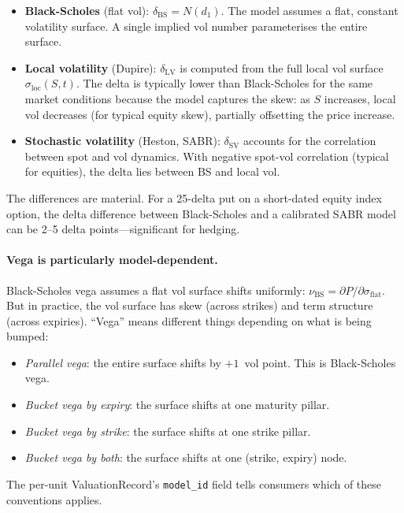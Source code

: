 \documentclass[11pt,a4paper]{article}
\begin{document}
\begin{itemize}[nosep]
\item \textbf{Black-Scholes} (flat vol): $\delta_{\mathrm{BS}} = N(d_1)$.  The model assumes a flat, constant volatility surface.  A single implied vol number parameterises the entire surface.
\item \textbf{Local volatility} (Dupire): $\delta_{\mathrm{LV}}$ is computed from the full local vol surface $\sigma_{\mathrm{loc}}(S, t)$.  The delta is typically lower than Black-Scholes for the same market conditions because the model captures the skew: as $S$ increases, local vol decreases (for typical equity skew), partially offsetting the price increase.
\item \textbf{Stochastic volatility} (Heston, SABR): $\delta_{\mathrm{SV}}$ accounts for the correlation between spot and vol dynamics.  With negative spot-vol correlation (typical for equities), the delta lies between BS and local vol.
\end{itemize}

\noindent The differences are material.  For a 25-delta put on a short-dated equity index option, the delta difference between Black-Scholes and a calibrated SABR model can be 2--5 delta points---significant for hedging.

\paragraph{Vega is particularly model-dependent.}  Black-Scholes vega assumes a flat vol surface shifts uniformly: $\nu_{\mathrm{BS}} = \partial P / \partial \sigma_{\mathrm{flat}}$.  But in practice, the vol surface has skew (across strikes) and term structure (across expiries).  ``Vega'' means different things depending on what is being bumped:
\begin{itemize}[nosep]
\item \emph{Parallel vega}: the entire surface shifts by $+1$~vol point.  This is Black-Scholes vega.
\item \emph{Bucket vega by expiry}: the surface shifts at one maturity pillar.
\item \emph{Bucket vega by strike}: the surface shifts at one strike pillar.
\item \emph{Bucket vega by both}: the surface shifts at one (strike, expiry) node.
\end{itemize}
The per-unit ValuationRecord's \texttt{model\_id} field tells consumers which of these conventions applies.
\end{document}
